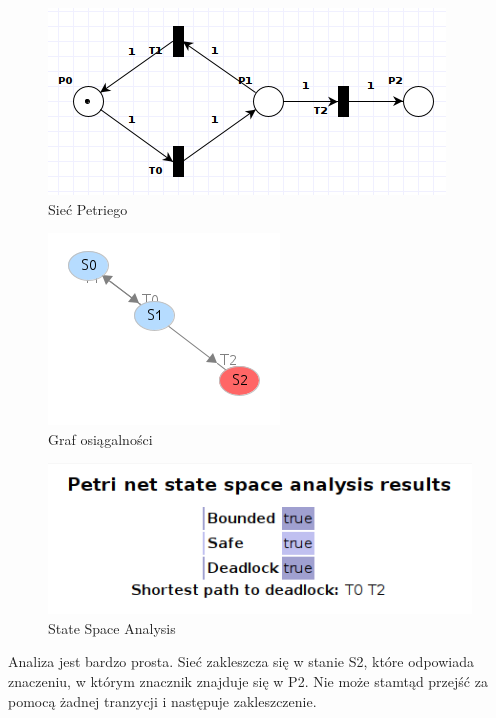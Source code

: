 \documentclass[12pt,a4paper,table]{article}
\begin{document}
    \begin{figure}[H]
        \centering
        \includegraphics[width=0.8\linewidth]{img/zad7-1.png}
        \caption{Sieć Petriego}
        \label{fig:zad7-1}
    \end{figure}

    \begin{figure}[H]
        \centering
        \includegraphics[width=0.6\linewidth]{img/zad7-2.png}
        \caption{Graf osiągalności}
        \label{fig:zad7-2}
    \end{figure}

    \begin{figure}[H]
        \centering
        \includegraphics[width=0.6\linewidth]{img/zad7-3.png}
        \caption{State Space Analysis}
        \label{fig:zad7-3}
    \end{figure}

    Analiza jest bardzo prosta. Sieć zakleszcza się w stanie S2, które odpowiada znaczeniu, w którym
    znacznik znajduje się w P2. Nie może stamtąd przejść za pomocą żadnej tranzycji i następuje zakleszczenie.
\end{document}
